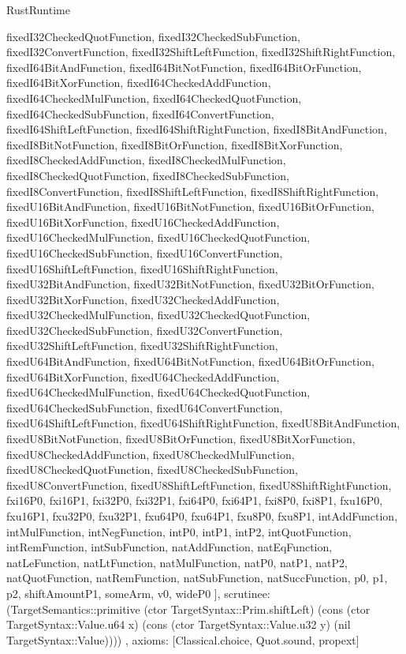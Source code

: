 \begin{lexlean}{RustRuntime}
\begin{semanticmodule}
{{      fixedI32CheckedQuotFunction,
      fixedI32CheckedSubFunction,
      fixedI32ConvertFunction,
      fixedI32ShiftLeftFunction,
      fixedI32ShiftRightFunction,
      fixedI64BitAndFunction,
      fixedI64BitNotFunction,
      fixedI64BitOrFunction,
      fixedI64BitXorFunction,
      fixedI64CheckedAddFunction,
      fixedI64CheckedMulFunction,
      fixedI64CheckedQuotFunction,
      fixedI64CheckedSubFunction,
      fixedI64ConvertFunction,
      fixedI64ShiftLeftFunction,
      fixedI64ShiftRightFunction,
      fixedI8BitAndFunction,
      fixedI8BitNotFunction,
      fixedI8BitOrFunction,
      fixedI8BitXorFunction,
      fixedI8CheckedAddFunction,
      fixedI8CheckedMulFunction,
      fixedI8CheckedQuotFunction,
      fixedI8CheckedSubFunction,
      fixedI8ConvertFunction,
      fixedI8ShiftLeftFunction,
      fixedI8ShiftRightFunction,
      fixedU16BitAndFunction,
      fixedU16BitNotFunction,
      fixedU16BitOrFunction,
      fixedU16BitXorFunction,
      fixedU16CheckedAddFunction,
      fixedU16CheckedMulFunction,
      fixedU16CheckedQuotFunction,
      fixedU16CheckedSubFunction,
      fixedU16ConvertFunction,
      fixedU16ShiftLeftFunction,
      fixedU16ShiftRightFunction,
      fixedU32BitAndFunction,
      fixedU32BitNotFunction,
      fixedU32BitOrFunction,
      fixedU32BitXorFunction,
      fixedU32CheckedAddFunction,
      fixedU32CheckedMulFunction,
      fixedU32CheckedQuotFunction,
      fixedU32CheckedSubFunction,
      fixedU32ConvertFunction,
      fixedU32ShiftLeftFunction,
      fixedU32ShiftRightFunction,
      fixedU64BitAndFunction,
      fixedU64BitNotFunction,
      fixedU64BitOrFunction,
      fixedU64BitXorFunction,
      fixedU64CheckedAddFunction,
      fixedU64CheckedMulFunction,
      fixedU64CheckedQuotFunction,
      fixedU64CheckedSubFunction,
      fixedU64ConvertFunction,
      fixedU64ShiftLeftFunction,
      fixedU64ShiftRightFunction,
      fixedU8BitAndFunction,
      fixedU8BitNotFunction,
      fixedU8BitOrFunction,
      fixedU8BitXorFunction,
      fixedU8CheckedAddFunction,
      fixedU8CheckedMulFunction,
      fixedU8CheckedQuotFunction,
      fixedU8CheckedSubFunction,
      fixedU8ConvertFunction,
      fixedU8ShiftLeftFunction,
      fixedU8ShiftRightFunction,
      fxi16P0,
      fxi16P1,
      fxi32P0,
      fxi32P1,
      fxi64P0,
      fxi64P1,
      fxi8P0,
      fxi8P1,
      fxu16P0,
      fxu16P1,
      fxu32P0,
      fxu32P1,
      fxu64P0,
      fxu64P1,
      fxu8P0,
      fxu8P1,
      intAddFunction,
      intMulFunction,
      intNegFunction,
      intP0,
      intP1,
      intP2,
      intQuotFunction,
      intRemFunction,
      intSubFunction,
      natAddFunction,
      natEqFunction,
      natLeFunction,
      natLtFunction,
      natMulFunction,
      natP0,
      natP1,
      natP2,
      natQuotFunction,
      natRemFunction,
      natSubFunction,
      natSuccFunction,
      p0,
      p1,
      p2,
      shiftAmountP1,
      someArm,
      v0,
      wideP0
    ],
    scrutinee: (TargetSemantics::primitive (ctor TargetSyntax::Prim.shiftLeft) (cons (ctor TargetSyntax::Value.u64 x) (cons (ctor TargetSyntax::Value.u32 y) (nil TargetSyntax::Value))))
  },
  axioms: [Classical.choice, Quot.sound, propext]
}


\end{semanticmodule}
\end{lexlean}
